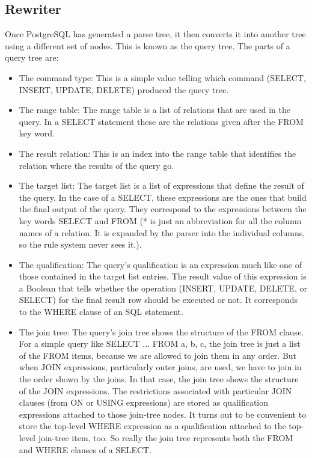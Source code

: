 \subsection{Rewriter}
\begin{flushleft}
\justify
Once PostgreSQL has generated a parse tree, it then converts it into another tree using a different set of nodes. This is known as the query tree. The parts of a query tree \cite{PostgreSQL internals} are:
\begin{itemize}
\item The command type: This is a simple value telling which command (SELECT, INSERT, UPDATE, DELETE) produced the query tree.
\item The range table: The range table is a list of relations that are used in the query. In a SELECT statement these are the relations given after the FROM key word.
\item The result relation: This is an index into the range table that identifies the relation where the results of the query go.
\item The target list: The target list is a list of expressions that define the result of the query. In the case of a SELECT, these expressions are the ones that build the final output of the query. They correspond to the expressions between the key words SELECT and FROM (* is just an abbreviation for all the column names of a relation. It is expanded by the parser into the individual columns, so the rule system never sees it.).
\item The qualification: The query's qualification is an expression much like one of those contained in the target list entries. The result value of this expression is a Boolean that tells whether the operation (INSERT, UPDATE, DELETE, or SELECT) for the final result row should be executed or not. It corresponds to the WHERE clause of an SQL statement.
\item The join tree: The query's join tree shows the structure of the FROM clause. For a simple query like SELECT ... FROM a, b, c, the join tree is just a list of the FROM items, because we are allowed to join them in any order. But when JOIN expressions, particularly outer joins, are used, we have to join in the order shown by the joins. In that case, the join tree shows the structure of the JOIN expressions. The restrictions associated with particular JOIN clauses (from ON or USING expressions) are stored as qualification expressions attached to those join-tree nodes. It turns out to be convenient to store the top-level WHERE expression as a qualification attached to the top-level join-tree item, too. So really the join tree represents both the FROM and WHERE clauses of a SELECT.

\end{itemize}
\end{flushleft}
